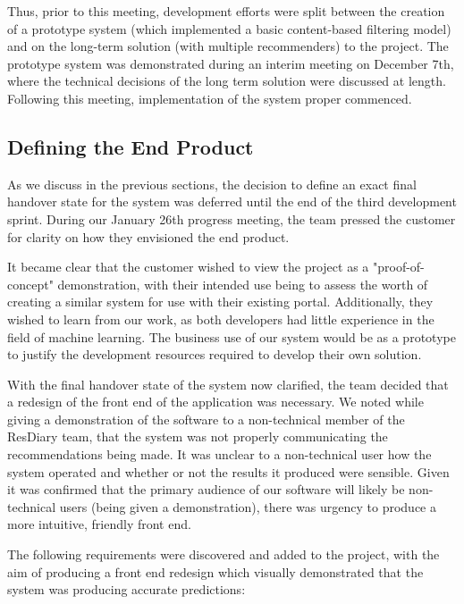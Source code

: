 \documentclass{l3proj}
\begin{document}
Thus, prior to this meeting, development efforts were split between the creation of a prototype system (which implemented a basic content-based filtering model) and on the long-term solution (with multiple recommenders) to the project. The prototype system was demonstrated during an interim meeting on December 7th, where the technical decisions of the long term solution were discussed at length. Following this meeting, implementation of the system proper commenced. 


\newpage
\subsection{Defining the End Product}
\label{sec:jandefinedstate}

As we discuss in the previous sections, the decision to define an exact final handover state for the system was deferred until the end of the third development sprint. During our January 26th progress meeting, the team pressed the customer for clarity on how they envisioned the end product. 

It became clear that the customer wished to view the project as a "proof-of-concept" demonstration, with their intended use being to assess the worth of creating a similar system for use with their existing portal. Additionally, they wished to learn from our work, as both developers had little experience in the field of machine learning. The business use of our system would be as a prototype to justify the development resources required to develop their own solution.

With the final handover state of the system now clarified, the team decided that a redesign of the front end of the application was necessary. We noted while giving a demonstration of the software to a non-technical member of the ResDiary team, that the system was not properly communicating the recommendations being made. It was unclear to a non-technical user how the system operated and whether or not the results it produced were sensible. Given it was confirmed that the primary audience of our software will likely be non-technical users (being given a demonstration), there was urgency to produce a more intuitive, friendly front end. 

The following requirements were discovered and added to the project, with the aim of producing a front end redesign which visually demonstrated that the system was producing accurate predictions:
\end{document}
